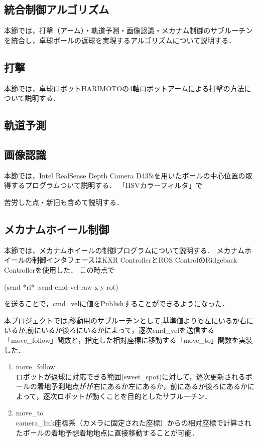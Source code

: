 \documentclass[10pt, oneside, titlepage]{ltjsarticle}  %
\begin{document}
\subsection{統合制御アルゴリズム}
本節では，打撃（アーム）・軌道予測・画像認識・メカナム制御のサブルーチンを統合し，卓球ボールの返球を実現するアルゴリズムについて説明する．
\subsection{打撃}
本節では，卓球ロボットHARIMOTOの4軸ロボットアームによる打撃の方法について説明する．
\subsection{軌道予測}
\subsection{画像認識}
本節では，Intel RealSense Depth Camera D435iを用いたボールの中心位置の取得するプログラムついて説明する．
「HSVカラーフィルタ」で

苦労した点・新旧も含めて説明する．\cite{detect2}
\subsection{メカナムホイール制御}
本節では，メカナムホイールの制御プログラムについて説明する．
メカナムホイールの制御インタフェースはKXR ControllerとROS ControlのRidgeback Controllerを使用した．
この時点で
\begin{screen}
(send *ri* :send-cmd-vel-raw x y rot)
\end{screen}
を送ることで，cmd\_velに値をPublishすることができるようになった．

本プロジェクトでは,移動用のサブルーチンとして,基準値よりも左にいるか右にいるか,前にいるか後ろにいるかによって，逐次cmd\_velを送信する「move\_follow」関数と，指定した相対座標に移動する「move\_to」関数を実装した．
\begin{enumerate}
\item move\_follow \\
  ロボットが返球に対応できる範囲(sweet\_spot)に対して，逐次更新されるボールの着地予測地点がが右にあるか左にあるか，前にあるか後ろにあるかによって，逐次ロボットが動くことを目的としたサブルーチン．
  
\item move\_to \\
  camera\_link座標系（カメラに固定された座標）からの相対座標で計算されたボールの着地予想着地地点に直接移動することが可能．
\end{enumerate}
\cite{mecanum}
\end{document}
